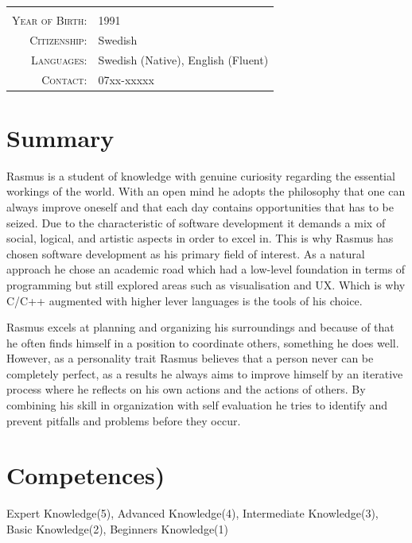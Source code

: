 \documentclass[a4paper,10pt]{article}
\begin{document}
\begin{tabular}{rl}
    \textsc{} &    \\
    \textsc{Year of Birth:} &   1991   \\
    \textsc{Citizenship:}   &   Swedish \\ 
    \textsc{Languages:}  & Swedish (Native), English (Fluent) \\
    \textsc{Contact:}   & 07xx-xxxxx \\
\end{tabular}

\section{Summary}
Rasmus is a student of knowledge with genuine curiosity regarding the essential workings of the world. With an open mind he adopts the philosophy that one can always improve oneself and that each day contains opportunities that has to be seized. Due to the characteristic of software development it demands a mix of social, logical, and artistic aspects in order to excel
in. This is why Rasmus has chosen software development as his primary field of interest. As a natural approach he chose an academic road which had a low-level foundation in terms of programming but still explored areas such as visualisation and UX. Which is why C/C++ augmented with higher lever languages is the tools of his choice.

Rasmus excels at planning and organizing his surroundings and because of that he often finds himself in a position to
coordinate others, something he does well. However, as a personality trait Rasmus believes that a person never can be
completely perfect, as a results he always aims to improve himself by an iterative process where he reflects on his own
actions and the actions of others. By combining his skill in organization with self evaluation he tries to identify and
prevent pitfalls and problems before they occur.

\section{Competences)}
Expert Knowledge(5), Advanced Knowledge(4), Intermediate Knowledge(3), Basic Knowledge(2), Beginners Knowledge(1)
\end{document}
